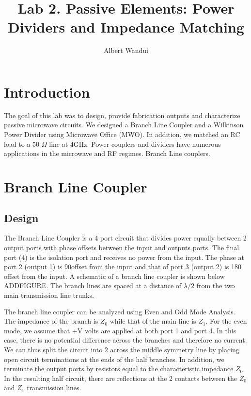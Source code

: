\documentclass[twocolumn, aps, apl]{revtex4-1}
\begin{document}
\title{Lab 2. Passive Elements: Power Dividers and Impedance Matching }
\author{Albert Wandui}
\maketitle

\section*{Introduction}
The goal of this lab was to design, provide fabrication outputs and characterize passive microwave circuits. We designed a Branch Line Coupler and a Wilkinson Power Divider using Microwave Office (MWO). In addition, we matched an RC load to a 50 $\Omega$ line at 4GHz. Power couplers and dividers have numerous applications in the microwave and RF regimes. Branch Line couplers.


\section*{Branch Line Coupler}

\subsection{Design}
The Branch Line Coupler is a 4 port circuit that divides power equally between 2 output ports with phase offsets between the input and outputs ports. The final port (4) is the isolation port and receives no power from the input. The phase at port 2 (output 1) is 90\textdegree offset from the input and that of port 3 (output 2) is 180 \textdegree offset from the input. A schematic of a branch line coupler is shown below ADDFIGURE. The branch lines are spaced at a distance of $\lambda/2$ from the two main transmission line trunks. 

The branch line coupler can be analyzed using Even and Odd Mode Analysis. The impedance of the branch is $Z_0$ while that of the main line is $Z_1$. For the even mode, we assume that +V volts are applied at both port 1 and port 4. In this case, there is no potential difference across the branches and therefore no current. We can thus split the circuit into 2 across the middle symmetry line by placing open circuit terminations at the ends of the half branches. In addition, we terminate the output ports by resistors equal to the characteristic impedance $Z_0$. In the resulting half circuit, there are reflections at the 2 contacts between the $Z_0$ and $Z_1$ transmission lines. 
\end{document}
